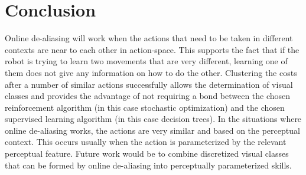 \documentclass[12pt]{article}
\begin{document}
\section{Conclusion}

Online de-aliasing will work when the actions that need to be taken in different contexts are near to each other in action-space. This supports the fact that if the robot is trying to learn two movements that are very different, learning one of them does not give any information on how to do the other. Clustering the costs after a number of similar actions successfully allows the determination of visual classes and provides the advantage of not requiring a bond between the chosen reinforcement algorithm (in this case stochastic optimization) and the chosen supervised learning algorithm (in this case decision trees). In the situations where online de-aliasing works, the actions are very similar and based on the perceptual context. This occurs usually when the action is parameterized by the relevant perceptual feature. Future work would be to combine discretized visual classes that can be formed by online de-aliasing into perceptually parameterized skills.

%


\end{document}
